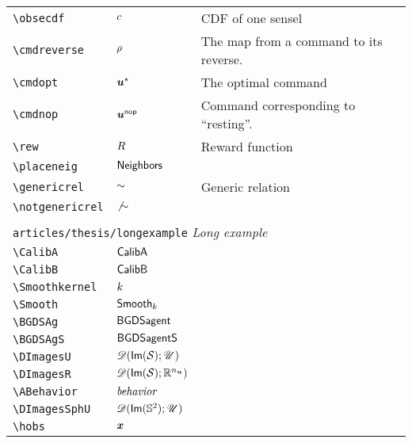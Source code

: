 \begin{longtable}{lll}
 {\color[rgb]{0.5,0.5,0.5}\texttt{\textbackslash obsecdf}} & ${c}$ &  CDF of one sensel\\ 
 {\color[rgb]{0.5,0.5,0.5}\texttt{\textbackslash cmdreverse}} & $\rho$ &  The map from a command to its reverse.\\ 
 {\color[rgb]{0.5,0.5,0.5}\texttt{\textbackslash cmdopt}} & $\boldsymbol{u}^\star$ &  The optimal command\\ 
 {\color[rgb]{0.5,0.5,0.5}\texttt{\textbackslash cmdnop}} & $\boldsymbol{u}^{\mathsf{nop}}$ &  Command corresponding to ``resting''.\\ 
 {\color[rgb]{0.5,0.5,0.5}\texttt{\textbackslash rew}} & $R$ &  Reward function\\ 
 {\color[rgb]{0.5,0.5,0.5}\texttt{\textbackslash placeneig}} & $\mathsf{Neighbors}$ & \\ 
 {\color[rgb]{0.5,0.5,0.5}\texttt{\textbackslash genericrel}} & $\sim$ &  Generic relation\\ 
 {\color[rgb]{0.5,0.5,0.5}\texttt{\textbackslash notgenericrel}} & $\not{\sim}$ & \\ 
  &  & \\ 
 \multicolumn{3}{l}{{\color[rgb]{0.5,0.5,0.5}\texttt{articles/thesis/longexample}} \emph{Long example}}\\ 
 \hline
{\color[rgb]{0.5,0.5,0.5}\texttt{\textbackslash CalibA}} & $\textsf{{CalibA}}$ & \\ 
 {\color[rgb]{0.5,0.5,0.5}\texttt{\textbackslash CalibB}} & $\textsf{{CalibB}}$ & \\ 
 {\color[rgb]{0.5,0.5,0.5}\texttt{\textbackslash Smoothkernel}} & $k$ & \\ 
 {\color[rgb]{0.5,0.5,0.5}\texttt{\textbackslash Smooth}} & $\textsf{{Smooth}}_{k}$ & \\ 
 {\color[rgb]{0.5,0.5,0.5}\texttt{\textbackslash BGDSAg}} & $\textsf{{BGDSagent}}$ & \\ 
 {\color[rgb]{0.5,0.5,0.5}\texttt{\textbackslash BGDSAgS}} & $\textsf{{BGDSagentS}}$ & \\ 
 {\color[rgb]{0.5,0.5,0.5}\texttt{\textbackslash DImagesU}} & $\DImagesU$ & \\ 
 {\color[rgb]{0.5,0.5,0.5}\texttt{\textbackslash DImagesR}} & $\DImagesR$ & \\ 
 {\color[rgb]{0.5,0.5,0.5}\texttt{\textbackslash ABehavior}} & $\textit{behavior}$ & \\ 
 {\color[rgb]{0.5,0.5,0.5}\texttt{\textbackslash DImagesSphU}} & $\mathscr{D}(\mathsf{Im}(\mathbb{S}^2);\mathscr{U})$ & \\ 
 {\color[rgb]{0.5,0.5,0.5}\texttt{\textbackslash hobs}} & $\boldsymbol{x}$ & \\ 

\end{longtable}
